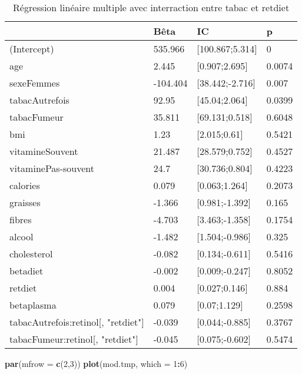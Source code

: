 \documentclass[]{article}
\newenvironment{Shaded}{\begin{snugshade}}{\end{snugshade}}
\newcommand{\KeywordTok}[1]{\textcolor[rgb]{0.13,0.29,0.53}{\textbf{#1}}}
\newcommand{\DataTypeTok}[1]{\textcolor[rgb]{0.13,0.29,0.53}{#1}}
\newcommand{\DecValTok}[1]{\textcolor[rgb]{0.00,0.00,0.81}{#1}}
\newcommand{\OperatorTok}[1]{\textcolor[rgb]{0.81,0.36,0.00}{\textbf{#1}}}
\newcommand{\NormalTok}[1]{#1}
\begin{document}
\begin{table}

\caption{\label{tab:unnamed-chunk-71}Régression linéaire multiple avec interraction entre tabac et retdiet}
\centering
\begin{tabular}[t]{l|l|l|l}
\hline
  & Bêta & IC & p\\
\hline
\rowcolor[HTML]{BBD2E1}  (Intercept) & 535.966 & [100.867;5.314] & 0\\
\hline
age & 2.445 & [0.907;2.695] & 0.0074\\
\hline
\rowcolor[HTML]{BBD2E1}  sexeFemmes & -104.404 & [38.442;-2.716] & 0.007\\
\hline
tabacAutrefois & 92.95 & [45.04;2.064] & 0.0399\\
\hline
\rowcolor[HTML]{BBD2E1}  tabacFumeur & 35.811 & [69.131;0.518] & 0.6048\\
\hline
bmi & 1.23 & [2.015;0.61] & 0.5421\\
\hline
\rowcolor[HTML]{BBD2E1}  vitamineSouvent & 21.487 & [28.579;0.752] & 0.4527\\
\hline
vitaminePas-souvent & 24.7 & [30.736;0.804] & 0.4223\\
\hline
\rowcolor[HTML]{BBD2E1}  calories & 0.079 & [0.063;1.264] & 0.2073\\
\hline
graisses & -1.366 & [0.981;-1.392] & 0.165\\
\hline
\rowcolor[HTML]{BBD2E1}  fibres & -4.703 & [3.463;-1.358] & 0.1754\\
\hline
alcool & -1.482 & [1.504;-0.986] & 0.325\\
\hline
\rowcolor[HTML]{BBD2E1}  cholesterol & -0.082 & [0.134;-0.611] & 0.5416\\
\hline
betadiet & -0.002 & [0.009;-0.247] & 0.8052\\
\hline
\rowcolor[HTML]{BBD2E1}  retdiet & 0.004 & [0.027;0.146] & 0.884\\
\hline
betaplasma & 0.079 & [0.07;1.129] & 0.2598\\
\hline
\rowcolor[HTML]{BBD2E1}  tabacAutrefois:retinol[, "retdiet"] & -0.039 & [0.044;-0.885] & 0.3767\\
\hline
tabacFumeur:retinol[, "retdiet"] & -0.045 & [0.075;-0.602] & 0.5474\\
\hline
\end{tabular}
\end{table}

\begin{Shaded}
\begin{Highlighting}[]
\KeywordTok{par}\NormalTok{(}\DataTypeTok{mfrow =} \KeywordTok{c}\NormalTok{(}\DecValTok{2}\NormalTok{,}\DecValTok{3}\NormalTok{))}
\KeywordTok{plot}\NormalTok{(mod.tmp, }\DataTypeTok{which =} \DecValTok{1}\OperatorTok{:}\DecValTok{6}\NormalTok{)}
\end{Highlighting}
\end{Shaded}
\end{document}
